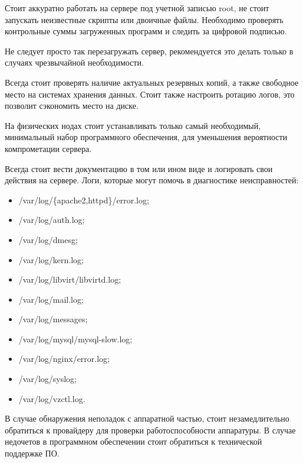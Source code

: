 Стоит аккуратно работать на сервере под учетной записью root, не стоит запускать неизвестные скрипты или двоичные файлы.
Необходимо проверять контрольные суммы загруженных программ и следить за цифровой подписью.

Не следует просто так перезагружать сервер, рекомендуется это делать только в случаях чрезвычайной необходимости.

Всегда стоит проверять наличие актуальных резервных копий, а также свободное место на системах хранения данных.
Стоит также настроить ротацию логов, это позволит сэкономить место на диске.

На физических нодах стоит устанавливать только самый необходимый, минимальный набор программного обеспечения, для уменьшения вероятности компрометации сервера.

Всегда стоит вести документацию в том или ином виде и логировать свои действия на сервере.
Логи, которые могут помочь в диагностике неисправностей:
\begin{itemize}
  \item /var/log/\{apache2,httpd\}/error.log;
  \item /var/log/auth.log;
  \item /var/log/dmesg;
  \item /var/log/kern.log;
  \item /var/log/libvirt/libvirtd.log;
  \item /var/log/mail.log;
  \item /var/log/messages;
  \item /var/log/mysql/mysql-slow.log;
  \item /var/log/nginx/error.log;
  \item /var/log/syslog;
  \item /var/log/vzctl.log.
\end{itemize}

В случае обнаружения неполадок с аппаратной частью, стоит незамедлительно обратиться к провайдеру для проверки работоспособности аппаратуры.
В случае недочетов в программном обеспечении стоит обратиться к технической поддержке ПО.

\clearpage
